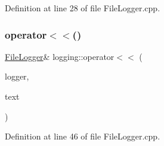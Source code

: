 Definition at line 28 of file File\+Logger.\+cpp.

\mbox{\label{namespacelogging_a7e47c8ca0cf4d8136496bb99b505ef5d}} 
\subsubsection{\texorpdfstring{operator$<$$<$()}{operator<<()}\hspace{0.1cm}{\footnotesize\ttfamily [2/2]}}
{\footnotesize\ttfamily \hyperlink{classlogging_1_1_file_logger}{File\+Logger}\& logging\+::operator$<$$<$ (\begin{DoxyParamCaption}\item[{\hyperlink{classlogging_1_1_file_logger}{File\+Logger} \&}]{logger,  }\item[{const char $\ast$}]{text }\end{DoxyParamCaption})}



Definition at line 46 of file File\+Logger.\+cpp.

